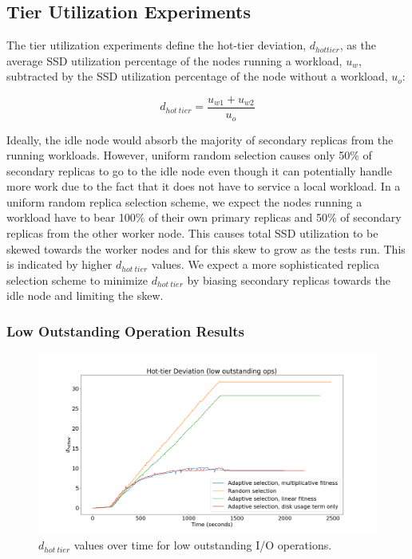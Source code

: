\documentclass[12pt]{article}
\begin{document}
  \subsection{Tier Utilization Experiments}

  The tier utilization experiments define the hot-tier deviation,
  $d_{hot tier}$, as the average SSD utilization percentage of the nodes
  running a workload, $u_{w}$, subtracted by the SSD utilization percentage of
  the node without a workload, $u_{o}$:
  
  \begin{equation}
    d_{hot\ tier} = \frac{u_{w1} + u_{w2}}{u_{o}}
  \end{equation}
  
  Ideally, the idle node would absorb the majority of secondary replicas from
  the running workloads. However, uniform random selection causes only 50\% of
  secondary replicas to go to the idle node even though it can potentially
  handle more work due to the fact that it does not have to service a local
  workload. In a uniform random replica selection scheme, we expect the
  nodes running a workload have to bear 100\% of their own primary replicas and
  50\% of secondary replicas from the other worker node. This causes total SSD
  utilization to be skewed towards the worker nodes and for this skew to grow
  as the tests run. This is indicated by higher $d_{hot\ tier}$ values. We
  expect a more sophisticated replica selection scheme to minimize
  $d_{hot\ tier}$ by biasing secondary replicas towards the idle node and
  limiting the skew.


    \subsubsection{Low Outstanding Operation Results}

    \begin{figure}[htbp]
      \centering
      \includegraphics[scale=0.32]{images/low_outstanding_exp.png} 
      \caption{$d_{hot\ tier}$ values over time for low outstanding I/O
               operations.}
      \label{fig:low_outstanding_tier_disparity}
    \end{figure}
\end{document}
